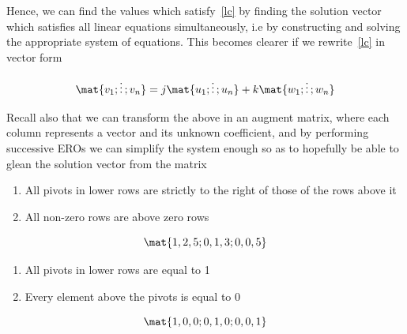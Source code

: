 \documentclass[english,course]{Notes}
\begin{document}
	      \par{Hence, we can find the values which satisfy~\ref{lc} by finding the solution vector which satisfies all linear equations simultaneously, i.e  by constructing and solving the appropriate system of equations. This becomes clearer if we rewrite~\ref{lc} in vector form }
	      
	      $$ \mat{v_{1};\vdots;v_{n}} = j\mat{u_{1};\vdots;u_{n}} + k\mat{w_{1};\vdots;w_{n}} $$
	      
	      \par{Recall also that we can transform the above in an augment matrix, where each column represents a vector and its unknown coefficient, and by performing successive EROs we can simplify the system enough so as to hopefully be able to glean the solution vector from the matrix}
	      
	      
	      \begin{minipage}{\linewidth}
	      	\centering
	      	\begin{minipage}{0.45\linewidth}
	      		\begin{enumerate}
	      			\item All pivots in lower rows are strictly to the right of those of the rows above it
	      			\item All non-zero rows are above zero rows
	      		\end{enumerate}
	      	\end{minipage}
	      	\hspace{0.05\linewidth}
	      	\begin{minipage}{0.45\linewidth}
	      		$$\mat{1,2,5;0,1,3;0,0,5}$$
	      	\end{minipage}
	      \end{minipage}
	      
	      \begin{minipage}{\linewidth}
	      	\centering
	      	\begin{minipage}{0.45\linewidth}
	      		\begin{enumerate}
	      			\item All pivots in lower rows are equal to 1
	      			\item Every element above the pivots is equal to 0
	      		\end{enumerate}
	      	\end{minipage}
	      	\hspace{0.05\linewidth}
	      	\begin{minipage}{0.45\linewidth}
	      		$$\mat{1,0,0;0,1,0;0,0,1}$$
	      	\end{minipage}
	      \end{minipage}
\end{document}
